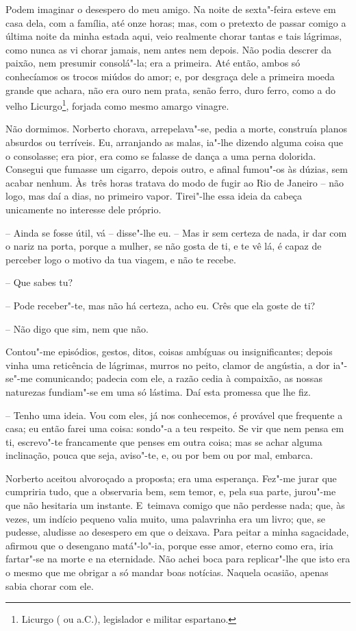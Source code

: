 Podem imaginar o desespero do meu amigo. Na noite de sexta"-feira esteve
em casa dela, com a família, até onze horas; mas, com o pretexto de
passar comigo a última noite da minha estada aqui, veio realmente chorar
tantas e tais lágrimas, como nunca as vi chorar jamais, nem antes nem
depois. Não podia descrer da paixão, nem presumir consolá"-la; era a
primeira. Até então, ambos só conhecíamos os trocos miúdos do amor; e,
por desgraça dele a primeira moeda grande que achara, não era ouro nem
prata, senão ferro, duro ferro, como a do velho Licurgo\footnote{Licurgo
  ( ou  a.C.), legislador e militar espartano.}, forjada como
mesmo amargo vinagre.

Não dormimos. Norberto chorava, arrepelava"-se, pedia a morte, construía
planos absurdos ou terríveis. Eu, arranjando as malas, ia"-lhe dizendo
alguma coisa que o consolasse; era pior, era como se falasse de dança a
uma perna dolorida. Consegui que fumasse um cigarro, depois outro, e
afinal fumou"-os às dúzias, sem acabar nenhum. Às~três horas tratava do
modo de fugir ao Rio de Janeiro -- não logo, mas daí a dias, no primeiro
vapor. Tirei"-lhe essa ideia da cabeça unicamente no interesse dele
próprio.

-- Ainda se fosse útil, vá -- disse"-lhe eu. -- Mas ir sem certeza de
nada, ir dar com o nariz na porta, porque a mulher, se não gosta de ti,
e te vê lá, é capaz de perceber logo o motivo da tua viagem, e não te
recebe.

-- Que sabes tu?

-- Pode receber"-te, mas não há certeza, acho eu. Crês que ela goste de
ti?

-- Não digo que sim, nem que não.

Contou"-me episódios, gestos, ditos, coisas ambíguas ou insignificantes;
depois vinha uma reticência de lágrimas, murros no peito, clamor de
angústia, a dor ia"-se"-me comunicando; padecia com ele, a razão cedia à
compaixão, as nossas naturezas fundiam"-se em uma só lástima. Daí esta
promessa que lhe fiz.

-- Tenho uma ideia. Vou com eles, já nos conhecemos, é provável que
frequente a casa; eu então farei uma coisa: sondo"-a a teu respeito. Se
vir que nem pensa em ti, escrevo"-te francamente que penses em outra
coisa; mas se achar alguma inclinação, pouca que seja, aviso"-te, e, ou
por bem ou por mal, embarca.

Norberto aceitou alvoroçado a proposta; era uma esperança. Fez"-me jurar
que cumpriria tudo, que a observaria bem, sem temor, e, pela sua parte,
jurou"-me que não hesitaria um instante. E~teimava comigo que não
perdesse nada; que, às vezes, um indício pequeno valia muito, uma
palavrinha era um livro; que, se pudesse, aludisse ao desespero em que o
deixava. Para peitar a minha sagacidade, afirmou que o desengano
matá"-lo"-ia, porque esse amor, eterno como era, iria fartar"-se na morte e
na eternidade. Não achei boca para replicar"-lhe que isto era o mesmo que
me obrigar a só mandar boas notícias. Naquela ocasião, apenas sabia
chorar com ele.

